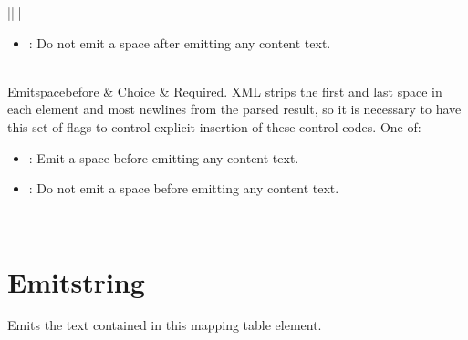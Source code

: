\documentclass[letterpaper,12pt,english,openany,oneside]{sphinxmanual}
\begin{document}
\begin{savenotes}
\begin{tabular}[t]{||||}
\begin{itemize}
\item {} 
: Do not emit a space after emitting any content text.

\end{itemize}
\\
\hline
Emit\sphinxhyphen{}space\sphinxhyphen{}before
&
Choice
&
Required. XML strips the first and last space in each element and most newlines from the parsed result, so it is necessary to have this set of flags to control explicit insertion of these control codes. One of:
\begin{itemize}
\item {} 
: Emit a space before emitting any content text.

\item {} 
: Do not emit a space before emitting any content text.

\end{itemize}
\\
\hline
\end{tabular}
\par
\sphinxattableend\end{savenotes}


\section{Emit\sphinxhyphen{}string}
\label{\detokenize{SaveAsXML_DirectivesRef:emit-string}}
Emits the text contained in this mapping table element.

\label{\detokenize{SaveAsXML_DirectivesRef:dtd-content-rule-10}}

\begin{sphinxVerbatim}[commandchars=\\\{\}]
\end{sphinxVerbatim}
\label{\detokenize{SaveAsXML_DirectivesRef:attributes-9}}
\end{document}
